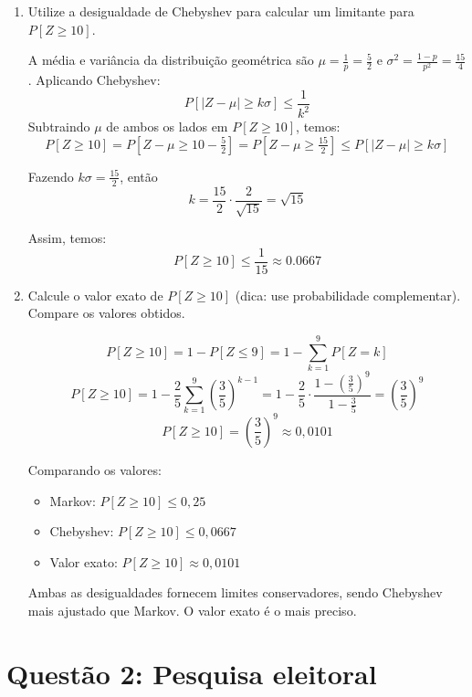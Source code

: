 \documentclass[12 pt]{article}
\begin{document}
\begin{enumerate}
\begin{tcolorbox}[colframe=black, title=Resposta:]
    \end{tcolorbox}
    \newpage
    \item Utilize a desigualdade de Chebyshev para calcular um limitante para $P[Z \geq 10]$.
    \begin{tcolorbox}[colframe=black, title=Resposta:]
    A média e variância da distribuição geométrica são $\mu = \frac{1}{p} = \frac{5}{2}$ e $\sigma^2 = \frac{1 - p}{p^2} = \frac{15}{4}$. Aplicando Chebyshev:
    $$
    P[|Z - \mu| \geq k \sigma] \leq \frac{1}{k^2}
    $$
    Subtraindo $\mu$ de ambos os lados em  $P[Z \geq 10]$, temos:
    $$
    P[Z \geq 10] = P[Z - \mu \geq 10 - \tfrac{5}{2}] = P[Z - \mu \geq \tfrac{15}{2}] \leq P[|Z - \mu| \geq k \sigma]
    $$

    Fazendo $k \sigma = \tfrac{15}{2}$, então 
    $$k = \frac{15}{2} \cdot \frac{2}{\sqrt{15}} = \sqrt{15}$$
    
    Assim, temos:
    $$
    \boxed{P[Z \geq 10] \leq \frac{1}{15} \approx 0.0667}
    $$
    \end{tcolorbox}

    \item Calcule o valor exato de $P[Z \geq 10]$ (dica: use probabilidade complementar). Compare os valores obtidos.
    \begin{tcolorbox}[colframe=black, title=Resposta:]
    $$
    P[Z \geq 10] = 1 - P[Z \leq 9] = 1 - \sum_{k=1}^9 P[Z = k]
    $$
    $$
    P[Z \geq 10] = 1 - \frac{2}{5} \sum_{k=1}^9 \left(\frac{3}{5}\right)^{k-1} = 1 - \frac{2}{5} \cdot \frac{1 - \left(\frac{3}{5}\right)^9}{1 - \frac{3}{5}} = \left(\frac{3}{5}\right)^9
    $$
    $$
    \boxed{P[Z \geq 10] = \left(\frac{3}{5}\right)^9 \approx 0{,}0101}
    $$

    Comparando os valores:
    \begin{itemize}
        \item Markov: $P[Z \geq 10] \leq 0{,}25$
        \item Chebyshev: $P[Z \geq 10] \leq 0{,}0667$
        \item Valor exato: $P[Z \geq 10] \approx 0{,}0101$
    \end{itemize}
    Ambas as desigualdades fornecem limites conservadores, sendo Chebyshev mais ajustado que Markov. O valor exato é o mais preciso.
    \end{tcolorbox}

\end{enumerate}

\section*{Questão 2: Pesquisa eleitoral}
\end{document}

